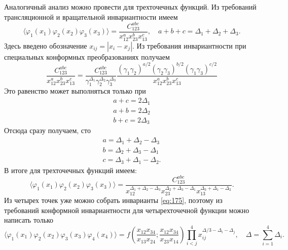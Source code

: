 \documentclass[a4paper,12pt]{article}
\theoremstyle{definition}
\theoremstyle{definition}
\theoremstyle{definition}
\begin{document}
Аналогичный анализ можно провести для трехточечных функций. Из требований трансляционной и вращательной инвариантности имеем
\begin{equation}
  \label{eq:192}
  \langle \varphi_{1}(x_{1})\varphi_{2}(x_{2})\varphi_{3}(x_{3})\rangle=\frac{C^{abc}_{123}}{x_{12}^{a} x_{23}^{b}x_{13}^{c}},\quad a+b+c=\Delta_{1}+\Delta_{2}+\Delta_{3}.
\end{equation}
Здесь введено обозначение $x_{ij}=|x_{i}-x_{j}|$.
Из требования инвариантности при специальных конформных преобразованиях получаем
\begin{equation}
  \label{eq:193}
  \frac{C^{abc}_{123}}{x_{12}^{a} x_{23}^{b}x_{13}^{c}}=\frac{C^{abc}_{123}}{\gamma_{1}^{\Delta_{1}}\gamma_{2}^{\Delta_{2}}\gamma_{3}^{\Delta_{3}}}\frac{(\gamma_{1}\gamma_{2})^{a/2}(\gamma_{2}\gamma_{3})^{b/2}(\gamma_{1}\gamma_{3})^{c/2}}{x_{12}^{a} x_{23}^{b}x_{13}^{c}}
\end{equation}
Это равенство может выполняться только при
\begin{equation}
  \label{eq:194}
  \begin{array}{l}
    a+c=2\Delta_{1}\\
    a+b=2\Delta_{2}\\
    b+c=2\Delta_{3}
  \end{array}
\end{equation}
Отсюда сразу получаем, сто
\begin{equation}
  \label{eq:195}
  \begin{array}{l}
    a=\Delta_{1}+\Delta_{2}-\Delta_{3}\\
    b=\Delta_{2}+\Delta_{3}-\Delta_{1}\\
    c=\Delta_{3}+\Delta_{1}-\Delta_{2}.
  \end{array}
\end{equation}
В итоге для трехточечных функций имеем:
\begin{equation}
  \label{eq:196}
   \langle \varphi_{1}(x_{1})\varphi_{2}(x_{2})\varphi_{3}(x_{3})\rangle=\frac{C^{abc}_{123}}{x_{12}^{\Delta_{1}+\Delta_{2}-\Delta_{3}} x_{23}^{\Delta_{2}+\Delta_{3}-\Delta_{1}}x_{13}^{\Delta_{3}+\Delta_{1}-\Delta_{2}}}.
\end{equation}
Из четырех точек уже можно собрать инварианты \eqref{eq:175}, поэтому из требований конформной инвариантности для четырехточечной функции можно написать только
\begin{equation}
  \label{eq:197}
  \langle \varphi_{1}(x_{1})\varphi_{2}(x_{2})\varphi_{3}(x_{3})\varphi_{4}(x_{4})\rangle=f\left(\frac{x_{12}x_{34}}{x_{13}x_{24}}; \frac{x_{12}x_{34}}{x_{23}x_{14}}\right) \prod_{i<j}^{4}x_{ij}^{\Delta/3-\Delta_{i}-\Delta_{j}},\quad \Delta=\sum_{i=1}^{4}\Delta_{i}.
\end{equation}
\end{document}

